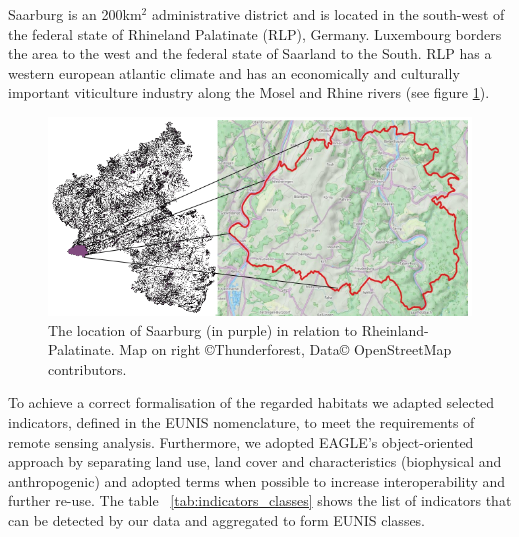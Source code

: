 \documentclass[authoryear, review,12pt,number]{elsarticle}
\begin{document}
Saarburg is an 200km$^{2}$ administrative district and is located in the
south-west of the federal state of Rhineland Palatinate (RLP), Germany.
Luxembourg borders the area to the west and the federal state of Saarland to
the South. RLP has a western european atlantic climate and has an economically
and culturally important viticulture industry along the Mosel and Rhine rivers
(see figure \ref{fig:study_area}).
\begin{figure}
    \includegraphics[width=\textwidth]{diagrams/study_area_closeup.png}
    \caption{The location of Saarburg (in purple) in relation to
    Rheinland-Palatinate. Map on right \copyright Thunderforest, Data\copyright
    OpenStreetMap contributors.}
\label{fig:study_area}
\end{figure}
To achieve a correct formalisation of the regarded habitats we adapted selected
indicators, defined in the EUNIS nomenclature, to meet the requirements of
remote sensing analysis.
Furthermore, we adopted EAGLE's object-oriented approach by separating land use,
land cover and characteristics (biophysical and anthropogenic) and adopted terms when possible to increase interoperability and further re-use.
The table ~\ref{tab:indicators_classes} shows the list of indicators that can be
detected by our data and aggregated to form EUNIS classes. 
\end{document}
